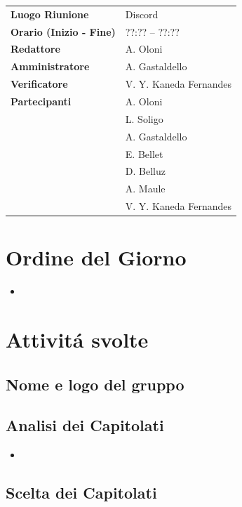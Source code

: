 \documentclass[a4paper,12pt]{article}
\begin{document}
\begin{tabular}{>{\bfseries}p{5cm} | p{10cm}}
Luogo Riunione & Discord \\[6pt]

Orario (Inizio - Fine) & ??:?? -- ??:?? \\[6pt]

Redattore &
  A. Oloni\\[6pt]

Amministratore & 
A. Gastaldello\\[6pt]

Verificatore &
V. Y. Kaneda Fernandes\\[6pt]

Partecipanti &
  A. Oloni\\ &
  L. Soligo\\&
  A. Gastaldello\\&
  E. Bellet\\&
  D. Belluz\\&
  A. Maule\\& 
  V. Y. Kaneda Fernandes\\[6pt]


\end{tabular}


\section{Ordine del Giorno}
    \begin{itemize}
    \item
    \end{itemize}


\section{Attivitá svolte}
\subsection{Nome e logo del gruppo}

\subsection{Analisi dei Capitolati}
\begin{itemize}
    \item 
\end{itemize}

\subsection{Scelta dei Capitolati}
\end{document}
